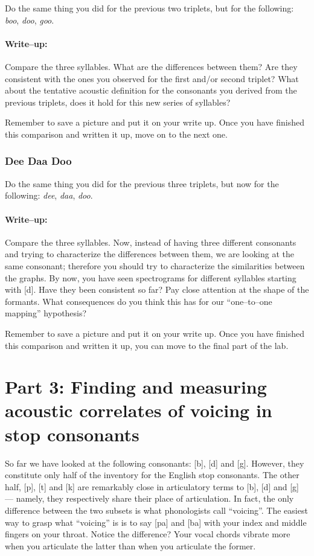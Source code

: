 \documentclass{article}
\begin{document}
Do the same thing you did for the previous two triplets, but for the following: \emph{boo}, \emph{doo}, \emph{goo}.

\paragraph{Write--up:} Compare the three syllables. What are the differences between them? Are they consistent with the ones you observed for the first and/or second triplet? What about the tentative acoustic definition for the consonants you derived from the previous triplets, does it hold for this new series of syllables?

Remember to save a picture and put it on your write up. Once you have finished this comparison and written it up, move on to the next one.

\subsubsection{Dee Daa Doo}

Do the same thing you did for the previous three triplets, but now for the following: \emph{dee}, \emph{daa}, \emph{doo}.

\paragraph{Write--up:} Compare the three syllables. Now, instead of having three different consonants and trying to characterize the differences between them, we are looking at the same consonant; therefore you should try to characterize the similarities between the graphs. By now, you have seen spectrograms for different syllables starting with [d]. Have they been consistent so far? Pay close attention at the shape of the formants. What consequences do you think this has for our ``one--to--one mapping'' hypothesis?

Remember to save a picture and put it on your write up. Once you have finished this comparison and written it up, you can move to the final part of the lab.


\section{Part 3: Finding and measuring acoustic correlates of voicing in stop consonants}

So far we have looked at the following consonants: [b], [d] and [g]. However, they constitute only half of the inventory for the English stop consonants. The other half, [p], [t] and [k] are remarkably close in articulatory terms to [b], [d] and [g] --- namely, they respectively share their place of articulation. In fact, the only difference between the two subsets is what phonologists call ``voicing''. The easiest way to grasp what ``voicing'' is is to say [pa] and [ba] with your index and middle fingers on your throat. Notice the difference? Your vocal chords vibrate more when you articulate the latter than when you articulate the former.
\end{document}
